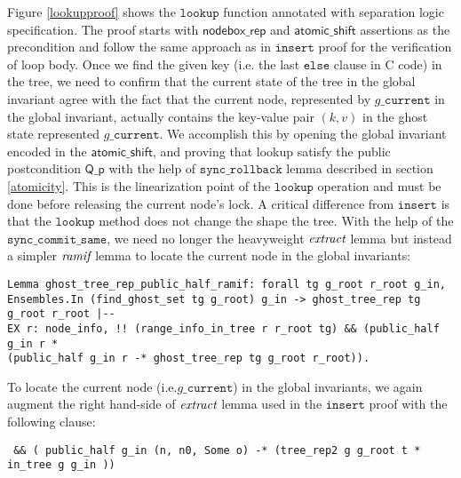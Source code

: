 \documentclass[acmsmall,screen]{acmart}\settopmatter{printfolios=true}
\begin{document}
Figure \ref{lookupproof} shows the $\texttt{lookup}$ function annotated with separation logic specification. The proof starts with $\mathsf{nodebox\_rep}$ and $\mathsf{atomic\_shift}$ assertions as the precondition and follow the same approach as in $\texttt{insert}$ proof for the verification of loop body. Once we find the given key (i.e. the last $\texttt{else}$ clause in C code) in the tree, we need to confirm that the current state of the tree in the global invariant agree with the fact that the current node, represented by $g\_\texttt{current}$ in the global invariant, actually contains the key-value pair $(k, v)$ in the ghost state represented $g\_\texttt{current}$. We accomplish this by opening the global invariant encoded in the $\mathsf{atomic\_shift}$, and proving that lookup satisfy the public postcondition $\mathsf{Q\_p}$ with the help of $\texttt{sync\_rollback}$ lemma described in section \ref{atomicity}. This is the linearization point of the $\texttt{lookup}$ operation and must be done before releasing the current node's lock. A critical difference from $\texttt{insert}$ is that the $\texttt{lookup}$ method does not change the shape the tree. With the help of the $\texttt{sync\_commit\_same}$, we need no longer the heavyweight $\emph{extract}$ lemma but instead a simpler $\emph{ramif}$ lemma to locate the current node in the global invariants:
\begin{verbatim}
Lemma ghost_tree_rep_public_half_ramif: forall tg g_root r_root g_in,
Ensembles.In (find_ghost_set tg g_root) g_in -> ghost_tree_rep tg g_root r_root |-- 
EX r: node_info, !! (range_info_in_tree r r_root tg) && (public_half g_in r * 
(public_half g_in r -* ghost_tree_rep tg g_root r_root)).
\end{verbatim}

To locate the current node (i.e.$g\_\texttt{current}$) in the global invariants, we again augment the right hand-side of $\emph{extract}$ lemma used in the $\texttt{insert}$ proof with the following clause:
\begin{verbatim}
 && ( public_half g_in (n, n0, Some o) -* (tree_rep2 g g_root t * in_tree g g_in ))
\end{verbatim}
  
\end{document}
